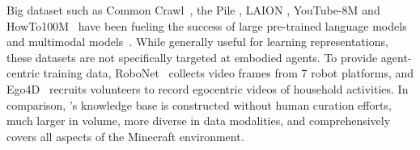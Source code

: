 \vspace{-0.05in}
Big dataset such as Common Crawl~\cite{commoncrawl}, the Pile \cite{gao2020pile}, LAION \cite{schuhmann2021laion}, YouTube-8M \cite{haija2016youtube8m} and HowTo100M~\cite{miech2019howto100m} have been fueling the success of large pre-trained language models~\cite{devlin2018bert,radford2019gpt2, brown2020gpt3} and multimodal models~\cite{sun2019learning, DBLP:conf/nips/AlayracRSARFSDZ20, DBLP:conf/cvpr/MiechASLSZ20, zhu2020actbert, DBLP:conf/aaai/AmraniBRB21, akbari2021vatt, xu2021videoclip}. While generally useful for learning representations, these datasets are not specifically targeted at embodied agents. To provide agent-centric training data, RoboNet~\cite{dasari19robonet} collects video frames from 7 robot platforms, and Ego4D~\cite{grauman2021ego4d} recruits volunteers to record egocentric videos of household activities. In comparison, \minedojo's knowledge base is constructed without human curation efforts, much larger in volume, more diverse in data modalities, and comprehensively covers all aspects of the Minecraft environment. 

